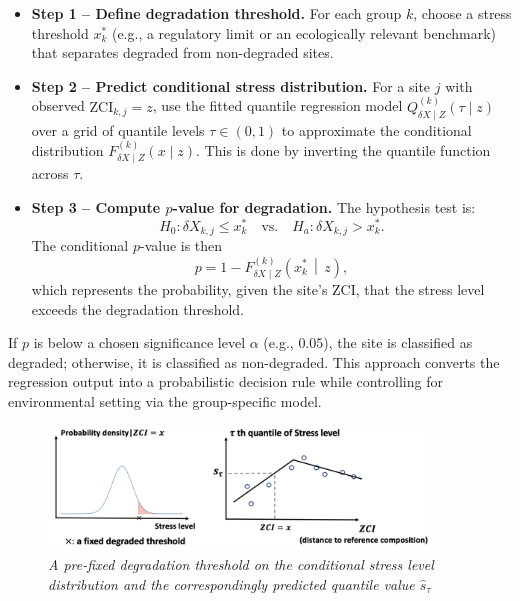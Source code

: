 \begin{itemize}
    \item \textbf{Step 1 -- Define degradation threshold.}  
    For each group $k$, choose a stress threshold $x_{k}^*$ 
    (e.g., a regulatory limit or an ecologically relevant benchmark) 
    that separates degraded from non-degraded sites.

    \item \textbf{Step 2 -- Predict conditional stress distribution.}  
    For a site $j$ with observed $\mathrm{ZCI}_{k,j}=z$, 
    use the fitted quantile regression model 
    $Q^{(k)}_{\delta X\mid Z}(\tau \mid z)$ over a grid of quantile levels 
    $\tau \in (0,1)$ to approximate the conditional distribution 
    $F_{\delta X\mid Z}^{(k)}(x \mid z)$. 
    This is done by inverting the quantile function across $\tau$.

    \item \textbf{Step 3 -- Compute $p$-value for degradation.}  
    The hypothesis test is:
    \[
    H_0: \delta X_{k,j} \le x_{k}^* \quad \text{vs.} \quad H_a: \delta X_{k,j} > x_{k}^* .
    \]
    The conditional $p$-value is then
    \[
    p = 1 - F_{\delta X\mid Z}^{(k)}\!\left( x_{k}^* \,\middle|\, z \right),
    \]
    which represents the probability, given the site's ZCI, that the stress level 
    exceeds the degradation threshold.
\end{itemize}

If $p$ is below a chosen significance level $\alpha$ (e.g., $0.05$), 
the site is classified as degraded; otherwise, it is classified as non-degraded.  
This approach converts the regression output into a probabilistic decision rule while 
controlling for environmental setting via the group-specific model.

\begin{figure}[!h]
\centering
\includegraphics[width=0.9\textwidth]{../presentation/figures/p16_degraded_threshold_and_quantile_regression.png}
\caption{\textit{A pre-fixed degradation threshold on the conditional stress level distribution and the correspondingly predicted quantile value \(\hat s_{\tau}\)}}
\label{fig:p16_degraded_threshold_and_quantile_regression}
\end{figure}
